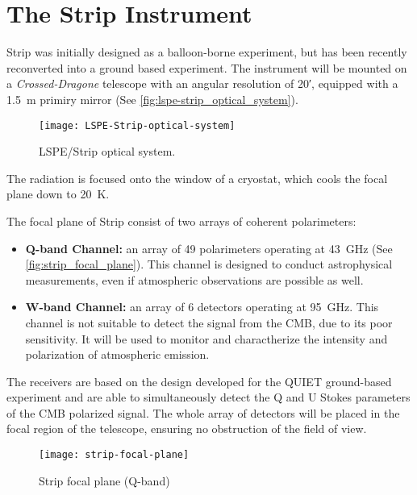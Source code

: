 \section{The Strip Instrument}

Strip was initially designed as a balloon-borne experiment, but has been
recently reconverted into a ground based experiment. The instrument will be
mounted on a \emph{Crossed-Dragone} telescope with an angular resolution of
\ang{;20;}, equipped with a \SI{1.5}{\meter} primiry mirror (See
\autoref{fig:lspe-strip_optical_system}).

\begin{figure}
        \centering
        \texttt{[image: LSPE-Strip-optical-system]}
        \caption{LSPE/Strip optical system.}
        \label{fig:lspe-strip_optical_system}
\end{figure}

The radiation is focused onto the window of a cryostat, which cools the
focal plane down to \SI{20}{\kelvin}.

The focal plane of Strip consist of two arrays of coherent
polarimeters:

\begin{itemize}
        \item \textbf{Q-band Channel:} an array of \num{49} polarimeters
        operating at \SI{43}{\giga\hertz} (See
        \autoref{fig:strip_focal_plane}). This channel is designed to
        conduct astrophysical measurements, even if atmospheric observations
        are possible as well.

        \item \textbf{W-band Channel:} an array of \num{6} detectors
        operating at \SI{95}{\giga\hertz}. This channel is not suitable to
        detect the signal from the CMB, due to its poor sensitivity. It
        will be used to monitor and charactherize the intensity and
        polarization of atmospheric emission.
\end{itemize}

The receivers are based on the design developed for the QUIET ground-based
experiment and are able to simultaneously detect the Q and U Stokes
parameters of the CMB polarized signal. The whole array of detectors will
be placed in the focal region of the telescope, ensuring no obstruction of
the field of view.

\begin{figure}
        \centering
        \texttt{[image: strip-focal-plane]}
        \caption{Strip focal plane (Q-band)}
        \label{fig:strip_focal_plane}
\end{figure}

